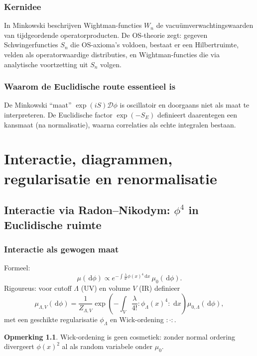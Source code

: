 \documentclass[11pt,a4paper,oneside]{book}
\theoremstyle{plain}
\theoremstyle{definition}
\newtheorem{remark}[theorem]{Opmerking}
\renewcommand{\dd}{\,\mathrm{d}}
\newcommand{\cD}{\mathcal{D}}
\begin{document}
	\section{Kernidee}
	In Minkowski beschrijven Wightman-functies $W_n$ de vacuümverwachtingswaarden van tijdgeordende operatorproducten.
	De OS-theorie zegt: gegeven Schwingerfuncties $S_n$ die OS-axioma’s voldoen, bestaat er een Hilbertruimte, velden als operatorwaardige distributies,
	en Wightman-functies die via analytische voortzetting uit $S_n$ volgen.
	
	\section{Waarom de Euclidische route essentieel is}
	De Minkowski ``maat'' $\exp(iS)\cD\phi$ is oscillatoir en doorgaans niet als maat te interpreteren.
	De Euclidische factor $\exp(-S_E)$ definieert daarentegen een kansmaat (na normalisatie), waarna correlaties als echte integralen bestaan.
	
	\part{Interactie, diagrammen, regularisatie en renormalisatie}
	
	\chapter{Interactie via Radon--Nikodym: $\phi^4$ in Euclidische ruimte}
	
	\section{Interactie als gewogen maat}
	Formeel:
	\[
	\mu(\dd\phi) \propto e^{-\int \frac{\lambda}{4!}\phi(x)^4\dd x}\,\mu_0(\dd\phi).
	\]
	Rigoureus: voor cutoff $\Lambda$ (UV) en volume $V$ (IR) definieer
	\[
	\mu_{\Lambda,V}(\dd\phi)=\frac{1}{Z_{\Lambda,V}}
	\exp\left(-\int_V \frac{\lambda}{4!}:\!\phi_\Lambda(x)^4\!:\,\dd x\right)\mu_{0,\Lambda}(\dd\phi),
	\]
	met een geschikte regularisatie $\phi_\Lambda$ en Wick-ordening $:\cdot:$.
	
	\begin{remark}
		Wick-ordening is geen cosmetiek: zonder normal ordering divergeert $\phi(x)^2$ al als random variabele onder $\mu_0$.
	\end{remark}
	
\end{document}
